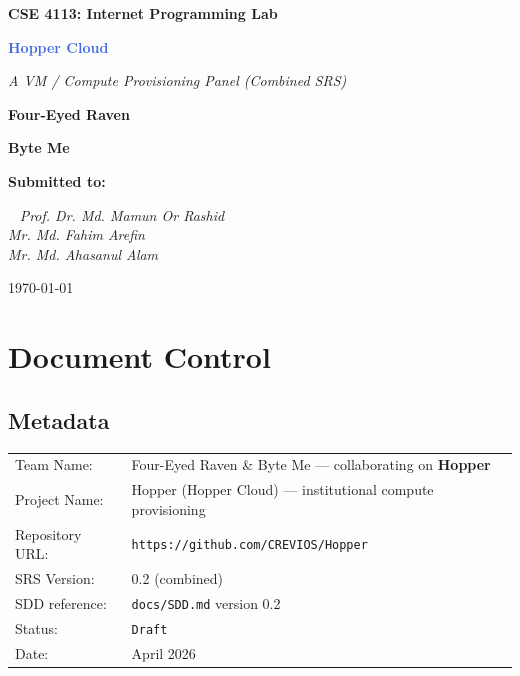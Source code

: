 \documentclass[12pt,a4paper]{article}
\begin{document}
\begin{titlepage}
  \centering
 \vspace*{0cm}
  {\Large\textbf{CSE 4113: Internet Programming Lab}\par}
  \vspace{0.5cm}
  {\huge\textbf{\textcolor{RoyalBlue}{Hopper Cloud}}\par}
  \vspace{0.3cm}
  {\fontsize{15}{18}\selectfont\itshape A VM / Compute Provisioning Panel (Combined SRS)}\\[1.2cm]
  {\Large\textbf{Four-Eyed Raven}\par}
  \vspace{0.7cm}
  {\Large\textbf{Byte Me}\par}
  \vspace{1.2cm}



{\Large\textbf{Submitted to:}\par}\
\vspace{0.5cm}
\textit{ \large Prof. Dr. Md. Mamun Or Rashid}\\ 
\textit{ \large Mr. Md. Fahim Arefin}\\ \vspace{0.5cm}
\textit{ \large Mr. Md. Ahasanul Alam}\\ \vspace{0.5cm}

  \vfill
  {\footnotesize \large \today \par}
\end{titlepage}

\pagecolor{white}
\color{black}

\newpage
\setcounter{tocdepth}{3}
\tableofcontents

\newpage

\section{Document Control}
\subsection{Metadata}

\begin{tabularx}{\textwidth}{@{}L{4cm}X@{}}
    Team Name:       & Four-Eyed Raven \& Byte Me --- collaborating on \textbf{Hopper} \\
    Project Name:    & Hopper (Hopper Cloud) --- institutional compute provisioning \\
  Repository URL:  & \texttt{https://github.com/CREVIOS/Hopper} \\
    SRS Version:     & 0.2 (combined) \\
    SDD reference:   & \texttt{docs/SDD.md} version 0.2 \\
  Status:          & \texttt{Draft} \\
    Date:            & April 2026 \\
\end{tabularx}
\end{document}
